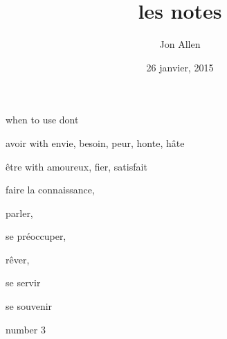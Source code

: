 \documentclass[letterpaper]{article}
\begin{document}
\title{les notes}
\date{26 janvier, 2015}
\author{Jon Allen}
\maketitle
when to use dont

avoir with envie, besoin, peur, honte, hâte

être with amoureux, fier, satisfait

faire la connaissance,

parler,

se préoccuper,

rêver,

se servir

se souvenir

number 3
\end{document}
